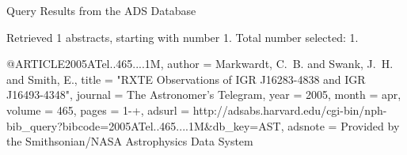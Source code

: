 Query Results from the ADS Database


Retrieved 1 abstracts, starting with number 1.  Total number selected: 1.

@ARTICLE{2005ATel..465....1M,
   author = {{Markwardt}, C.~B. and {Swank}, J.~H. and {Smith}, E.},
    title = "{RXTE Observations of IGR J16283-4838 and IGR J16493-4348}",
  journal = {The Astronomer's Telegram},
     year = 2005,
    month = apr,
   volume = 465,
    pages = {1-+},
   adsurl = {http://adsabs.harvard.edu/cgi-bin/nph-bib_query?bibcode=2005ATel..465....1M&db_key=AST},
  adsnote = {Provided by the Smithsonian/NASA Astrophysics Data System}
}


